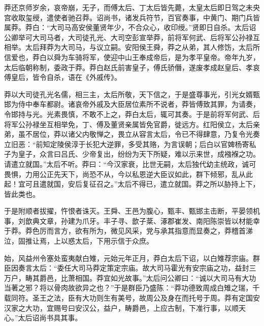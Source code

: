 \documentclass[12pt,UTF8]{ctexbook}
\begin{document}
莽还京师岁余，哀帝崩，无子，而傅太后、丁太后皆先薨，太皇太后即日驾之未央宫收取玺绶，遣使者驰召莽。诏尚书，诸发兵符节，百官奏事，中黄门、期门兵皆属莽。莽白：“大司马高安侯董贤年少，不合众心，收印绶。”贤即日自杀。太后诏公卿举可大司马者，大司徒孔光、大司空彭宣举莽，前将军何武、后将军公孙禄互相举。太后拜莽为大司马，与议立嗣。安阳侯王舜，莽之从弟，其人修饬，太后所信爱也，莽白以舜为车骑将军，使迎中山王奉成帝后，是为孝平皇帝。帝年九岁，太后临朝称制，委政于莽。莽白赵氏前害皇子，傅氏骄僭，遂废孝成赵皇后、孝哀傅皇后，皆令自杀，语在《外戚传》。



莽以大司徒孔光名儒，相三主，太后所敬，天下信之，于是盛尊事光，引光女婿甄邯为侍中奉车都尉。诸哀帝外戚及大臣居位素所不说者，莽皆傅致其罪，为请奏，令邯持与光。光素畏慎，不敢不上之，莽白太后，辄可其奏。于是前将军何武、后将军公孙禄坐互相举免，丁、傅及董贤亲属皆免官爵，徙远方。红阳侯立，太后亲弟，虽不居位，莽以诸父内敬惮之，畏立从容言太后，令已不得肆意，乃复令光奏立旧恶：“前知定陵侯淳于长犯大逆罪，多受其赂，为言误朝；后白以官婢杨寄私子为皇子，众言曰吕氏、少帝复出，纷纷为天下所疑，难以示来世，成襁褓之功。请遣立就国。”太后不听。莽曰：“今汉家衰，比世无嗣，太后独代幼主统政，诚可畏惧，力用公正先天下，尚恐不从，今以私恩逆大臣议如此，群下倾邪，乱从此起！宜可且遣就国，安后复征召之。”太后不得已，遣立就国。莽之所以胁持上下，皆此类也。



于是附顺者拔擢，忤恨者诛灭。王舜、王邑为腹心，甄丰、甄邯主击断，平晏领机事，刘歆典文章，孙建为爪牙。丰子寻、歆子棻、涿郡崔发、南阳陈崇皆以材能幸于莽。莽色厉而言方，欲有所为，微见风采，党与承其指意而显奏之，莽稽首涕泣，固推让焉，上以惑太后，下用示信于众庶。



始，风益州令塞处蛮夷献白雉，元始元年正月，莽白太后下诏，以白雉荐宗庙。群臣因奏言太后：“委任大司马莽定策定宗庙。故大司马霍光有安宗庙之功，益封三万户，畴其爵邑，比萧相国。莽宜如光故事。”太后问公卿曰：“诚以大司马有大功当著之邪？将以骨肉故欲异之也？”于是群臣乃盛陈：“莽功德致周成白雉之瑞，千载同符。圣王之法，臣有大功则生有美号，故周公及身在而托号于周。莽有定国安汉家之大功，宜赐号曰安汉公，益户，畴爵邑，上应古制，下准行事，以顺天心。”太后诏尚书具其事。
\end{document}
